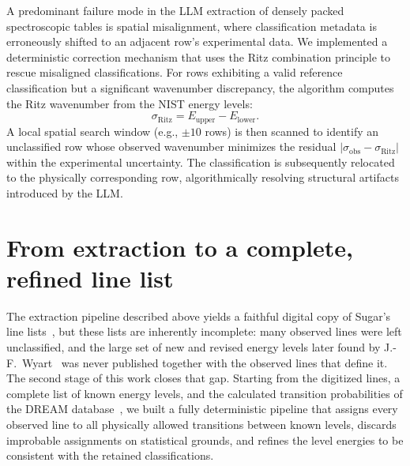 \documentclass[10pt]{article}
\begin{document}
A predominant failure mode in the LLM extraction of densely packed spectroscopic tables is spatial misalignment, where classification metadata is erroneously shifted to an adjacent row's experimental data. We implemented a deterministic correction mechanism that uses the Ritz combination principle to rescue misaligned classifications. For rows exhibiting a valid reference classification but a significant wavenumber discrepancy, the algorithm computes the Ritz wavenumber from the NIST energy levels:
\begin{equation}
    \sigma_{\text{Ritz}} = E_{\text{upper}} - E_{\text{lower}}.
\end{equation}
A local spatial search window (e.g., $\pm 10$ rows) is then scanned to identify an unclassified row whose observed wavenumber minimizes the residual $|\sigma_{\text{obs}} - \sigma_{\text{Ritz}}|$ within the experimental uncertainty. The classification is subsequently relocated to the physically corresponding row, algorithmically resolving structural artifacts introduced by the LLM.

\section{From extraction to a complete, refined line list}
\label{sec:lineclass}

The extraction pipeline described above yields a faithful digital copy of Sugar's line lists~\cite{Sugar1969,Sugar1974}, but these lists are inherently incomplete: many observed lines were left unclassified, and the large set of new and revised energy levels later found by J.-F.~Wyart~\cite{Wyart_unpub} was never published together with the observed lines that define it. The second stage of this work closes that gap. Starting from the digitized lines, a complete list of known energy levels, and the calculated transition probabilities of the DREAM database~\cite{DREAM}, we built a fully deterministic pipeline that assigns every observed line to all physically allowed transitions between known levels, discards improbable assignments on statistical grounds, and refines the level energies to be consistent with the retained classifications.
\end{document}
